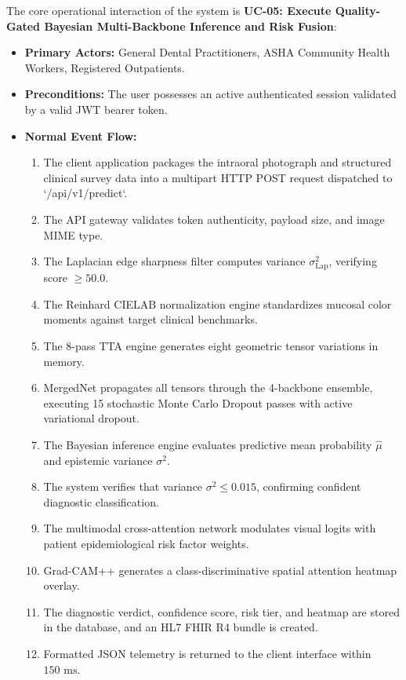 \documentclass[12pt,a4paper,oneside]{report}
\begin{document}
The core operational interaction of the system is \textbf{UC-05: Execute Quality-Gated Bayesian Multi-Backbone Inference and Risk Fusion}:
\begin{itemize}
    \item \textbf{Primary Actors:} General Dental Practitioners, ASHA Community Health Workers, Registered Outpatients.
    \item \textbf{Preconditions:} The user possesses an active authenticated session validated by a valid JWT bearer token.
    \item \textbf{Normal Event Flow:}
    \begin{enumerate}
        \item The client application packages the intraoral photograph and structured clinical survey data into a multipart HTTP POST request dispatched to `/api/v1/predict`.
        \item The API gateway validates token authenticity, payload size, and image MIME type.
        \item The Laplacian edge sharpness filter computes variance $\sigma^2_{\text{Lap}}$, verifying score $\ge 50.0$.
        \item The Reinhard CIELAB normalization engine standardizes mucosal color moments against target clinical benchmarks.
        \item The 8-pass TTA engine generates eight geometric tensor variations in memory.
        \item MergedNet propagates all tensors through the 4-backbone ensemble, executing 15 stochastic Monte Carlo Dropout passes with active variational dropout.
        \item The Bayesian inference engine evaluates predictive mean probability $\hat{\mu}$ and epistemic variance $\sigma^2$.
        \item The system verifies that variance $\sigma^2 \le 0.015$, confirming confident diagnostic classification.
        \item The multimodal cross-attention network modulates visual logits with patient epidemiological risk factor weights.
        \item Grad-CAM++ generates a class-discriminative spatial attention heatmap overlay.
        \item The diagnostic verdict, confidence score, risk tier, and heatmap are stored in the database, and an HL7 FHIR R4 bundle is created.
        \item Formatted JSON telemetry is returned to the client interface within $150\text{ ms}$.

\end{enumerate}
\end{itemize}
\end{document}
